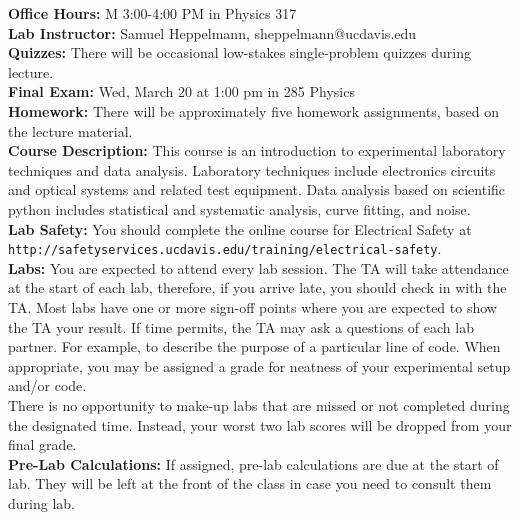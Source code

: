 \documentclass[12pt]{article}
\begin{document}
\noindent
\textbf{Office Hours:} M 3:00-4:00 PM in Physics 317 \\

\noindent
\textbf{Lab Instructor:} Samuel Heppelmann, sheppelmann@ucdavis.edu \\

\noindent
\textbf{Quizzes:}  There will be occasional low-stakes single-problem quizzes during lecture.\\


\textbf{Final Exam:} Wed, March 20 at 1:00 pm in 285 Physics \\

\noindent
\textbf{Homework:}  There will be approximately five homework assignments, based on the lecture 
material.\\

\noindent
\textbf {Course Description:}  This course is an introduction to experimental laboratory techniques and data analysis.  Laboratory techniques include electronics circuits and optical systems and related test equipment.  Data analysis based on scientific python includes statistical and systematic analysis, curve fitting, and noise.\\

\noindent
\textbf {Lab Safety:} 
You should complete the online course for Electrical Safety at \\
{\tt http://safetyservices.ucdavis.edu/training/electrical-safety}.\\


\noindent
\textbf {Labs:} 
You are expected to attend every lab session.  The TA will take attendance at the start of each lab, therefore, if you arrive late, you should check in with the TA.   Most labs have one or more sign-off points where you are expected to show the TA your result.  If time permits, the TA may ask a questions of each lab partner.  For example, to describe the purpose of a particular line of code.  When appropriate, you may be assigned a grade for neatness of your experimental setup and/or code.\\

There is no opportunity to make-up labs that are missed or not completed during the designated time.  Instead, your worst two lab scores will be dropped from your final grade.  \\

\noindent
\textbf {Pre-Lab Calculations:} 
If assigned, pre-lab calculations are due at the start of lab.  They will be left at the front of the class in case you need to consult them during lab.\\
\end{document}
